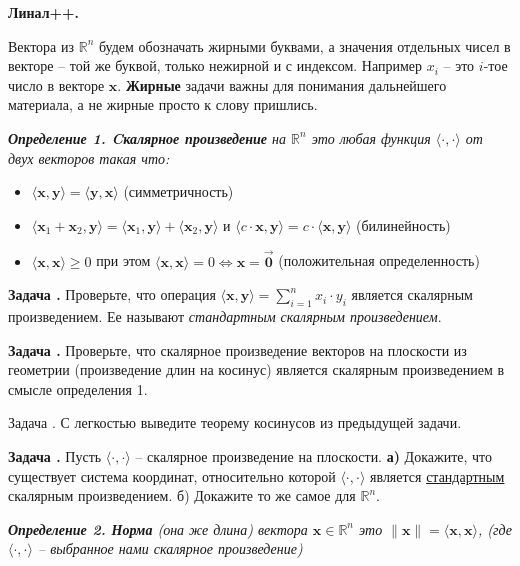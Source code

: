 \documentclass[12pt,a4paper]{article}
\def\R{\mathbb{R}}
\newcounter{znum}
\newcommand{\zz}[1]{\addtocounter{znum}{1} \textbf{Задача \arabic{znum}#1. }}
\newcommand{\z}[1]{\addtocounter{znum}{1} Задача \arabic{znum}#1. }
\begin{document}
\pagestyle{empty}

\begin{center} \Large \textbf{Линал++.}
\end{center}

Вектора из $\R^n$ будем обозначать жирными буквами, а значения отдельных чисел в векторе -- той же буквой, только нежирной и с индексом. Например $x_i$ -- это $i$-тое число в векторе $\mathbf{x}$. \textbf{Жирные} задачи важны для понимания дальнейшего материала, а не жирные просто к слову пришлись.

{\it \textbf{Определение 1. Cкалярное произведение} на $\R^n$ это любая функция $\langle \cdot , \cdot \rangle$ от двух векторов такая что:\par
\begin{itemize}
	\item $\langle \mathbf{x}, \mathbf{y} \rangle = \langle \mathbf{y}, \mathbf{x} \rangle$ (симметричность)
	\item $\langle \mathbf{x}_1 + \mathbf{x}_2, \mathbf{y} \rangle = \langle \mathbf{x}_1, \mathbf{y} \rangle + \langle \mathbf{x}_2, \mathbf{y} \rangle$  и $\langle c \cdot \mathbf{x}, \mathbf{y} \rangle = c \cdot \langle \mathbf{x}, \mathbf{y} \rangle$ (билинейность)
	\item $\langle \mathbf{x}, \mathbf{x} \rangle \geqslant 0$ при этом  $\langle \mathbf{x}, \mathbf{x} \rangle = 0 \Leftrightarrow \mathbf{x} = \overrightarrow{\mathbf{0}}$ (положительная определенность)
\end{itemize}
}

\zz{} Проверьте, что операция $ \langle \mathbf{x}, \mathbf{y} \rangle = \sum_{i = 1}^n x_i \cdot y_i$ является скалярным произведением. Ее называют {\it стандартным скалярным произведением}.

\zz{} Проверьте, что скалярное произведение векторов на плоскости из геометрии (произведение длин на косинус) является скалярным произведением в смысле определения 1.

\z{} С легкостью выведите теорему косинусов из предыдущей задачи.

\zz{} Пусть $\langle \cdot , \cdot \rangle$ -- скалярное произведение на плоскости. \textbf{а)} Докажите, что существует система координат, относительно которой $\langle \cdot , \cdot \rangle$ является \underline{стандартным} скалярным произведением. б) Докажите то же самое для $\R^n$.

{\it \textbf{Определение 2. Норма} (она же длина) вектора $\mathbf{x} \in \R^n$ это $ \|\mathbf{x}\| = \langle \mathbf{x}, \mathbf{x} \rangle$, (где $\langle \cdot , \cdot \rangle$ -- выбранное нами скалярное произведение)}
\end{document}

